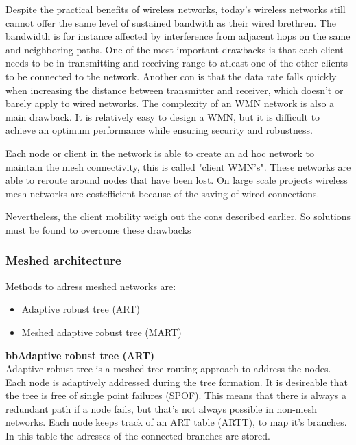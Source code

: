 \documentclass[10pt,a4paper]{article}
\begin{document}
Despite the practical benefits of wireless networks, today's wireless networks still cannot offer the same level of sustained bandwith as their wired brethren. The bandwidth is for instance affected by interference from adjacent hops on the same and neighboring paths. \cite{architectureandalgorithmsmultichannelwirelessmeshnetwork} One of the most important drawbacks is that each client needs to be in transmitting and receiving range to atleast one of the other clients to be connected to the network. \cite{wirelessmeshnetworksopportunitiesandchallenges} Another con is that the data rate falls quickly when increasing the distance between transmitter and receiver, which doesn't or barely apply to wired networks. \cite{architectureandalgorithmsmultichannelwirelessmeshnetwork} The complexity of an WMN network is also a main drawback. It is relatively easy to design a WMN, but it is difficult to achieve an optimum performance while ensuring security and robustness.\cite{wirelessmeshnetworksopportunitiesandchallenges} 

Each node or client in the network is able to create an ad hoc network to maintain the mesh connectivity, this is called "client WMN's". These networks are able to reroute around nodes that have been lost. On large scale projects wireless mesh networks are costefficient because of the saving of wired connections.\cite{meshnetworking} 

Nevertheless, the client mobility weigh out the cons described earlier. So solutions must be found to overcome these drawbacks


\subsubsection{Meshed architecture}


Methods to adress meshed networks are:
\begin{itemize}
\setlength\itemsep{0em}
    \item Adaptive robust tree (ART)
    \item Meshed adaptive robust tree (MART)
\end{itemize}

\textbf{\large bbAdaptive robust tree (ART)}\\
Adaptive robust tree is a meshed tree routing approach to address the nodes. Each node is adaptively addressed during the tree formation. It is desireable that the tree is free of single point failures (SPOF). This means that there is always a redundant path if a node fails, but that's not always possible in non-mesh networks. Each node keeps track of an ART table (ARTT), to map it's branches. In this table the adresses of the connected branches are stored.
\end{document}
